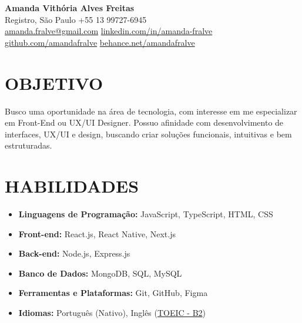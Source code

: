 \documentclass[a4paper,10pt]{article}
\begin{document}
\begin{center}
    {\LARGE \textbf{Amanda Vithória Alves Freitas}}\\[0.1cm]
    Registro, São Paulo \hspace{1mm} {\textbullet} \hspace{1mm} +55 13 99727-6945
    \\[0.2cm] 
    \href{mailto:amanda.fralve@gmail.com}{amanda.fralve@gmail.com}
    \hspace{1mm}{\textbullet}\hspace{1mm}
    \href{https://www.linkedin.com/in/amanda-fralve}{linkedin.com/in/amanda-fralve}
    \hspace{1mm}{\textbullet}\hspace{1mm}
    \href{https://github.com/amandafralve}{github.com/amandafralve}
    \hspace{1mm}{\textbullet}\hspace{1mm}
    \href{https://www.behance.net/amandafralve}{behance.net/amandafralve}
\end{center}



\section{OBJETIVO} 
    Busco uma oportunidade na área de tecnologia, com interesse em me especializar em Front-End ou UX/UI Designer. Possuo afinidade com desenvolvimento de interfaces, UX/UI e design, buscando criar soluções funcionais, intuitivas e bem estruturadas.



\section{HABILIDADES}
    \begin{itemize}
        \item \textbf{Linguagens de Programação:} JavaScript, TypeScript, HTML, CSS
        \item \textbf{Front-end:} React.js, React Native, Next.js
        \item \textbf{Back-end:} Node.js, Express.js
        \item \textbf{Banco de Dados:} MongoDB, SQL, MySQL 
        \item \textbf{Ferramentas e Plataformas:} Git, GitHub, Figma
        \item \textbf{Idiomas:} Português (Nativo), Inglês (\href{https://drive.google.com/file/d/1wQA662aiYXgXoeTkIuQ1UzJLbKcqJmrU/view}{TOEIC - B2})
    \end{itemize}
\end{document}
